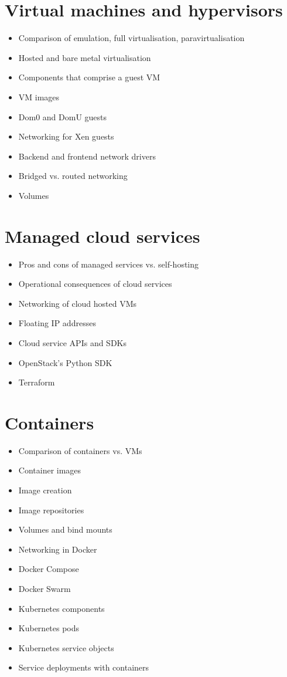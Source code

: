\documentclass{article}
\begin{document}
\section{Virtual machines and hypervisors}
\begin{itemize}
  \item Comparison of emulation, full virtualisation, paravirtualisation
  \item Hosted and bare metal virtualisation
  \item Components that comprise a guest VM
  \item VM images
  \item Dom0 and DomU guests
  \item Networking for Xen guests
  \item Backend and frontend network drivers
  \item Bridged vs. routed networking
  \item Volumes
\end{itemize}
  


\section{Managed cloud services}
\begin{itemize}
  \item Pros and cons of managed services vs. self-hosting
  \item Operational consequences of cloud services
  \item Networking of cloud hosted VMs
  \item Floating IP addresses
  \item Cloud service APIs and SDKs
  \item OpenStack's Python SDK
  \item Terraform
\end{itemize}

\section{Containers}
\begin{itemize}
  \item Comparison of containers vs. VMs
  \item Container images
  \item Image creation
  \item Image repositories
  \item Volumes and bind mounts
  \item Networking in Docker
  \item Docker Compose
  \item Docker Swarm
  \item Kubernetes components
  \item Kubernetes pods
  \item Kubernetes service objects
  \item Service deployments with containers
\end{itemize}
\end{document}
